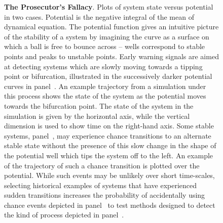 \begin{figure}
  \begin{center}
  \end{center} \caption{\textbf{The Prosecutor's Fallacy}. Plots of system
  state versus potential in two cases.  Potential is the negative integral
  of the mean of dynamical equation.  The potential function gives an
  intuitive picture of the stability of a system by imagining the curve as
  a surface on which a ball is free to bounce across -- wells correspond
  to stable points and peaks to unstable points.  Early warning signals
  are aimed at detecting systems which are slowly moving towards a tipping
  point or bifurcation, illustrated in the successively darker potential
  curves in panel~.  An example trajectory from
  a simulation under this process shows the state of the system as the
  potential moves towards the bifurcation point. The state of the system
  in the simulation is given by the horizontal axis, while the vertical
  dimension is used to show time on the right-hand axis.  Some stable
  systems, panel~, may experience chance transitions
  to an alternate stable state without the presence of this slow change
  in the shape of the potential well which tips the system off to the left.
  An example of the trajectory of such a chance transition is
  plotted over the potential.  While such events may be unlikely over
  short time-scales, selecting historical examples of systems that
  have experienced sudden transitions increases the probability of
  accidentally using chance events depicted in panel~
  to test methods designed to detect the kind of process depicted in
  panel~.} \label{fig:1}
\end{figure}




